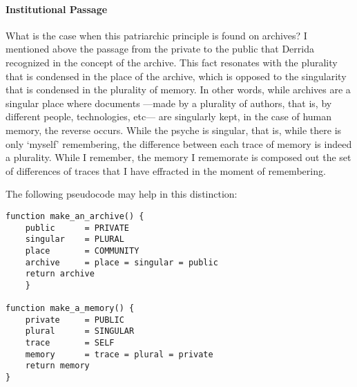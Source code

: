 \paragraph{Institutional Passage}
What is the case when this patriarchic principle is found on archives? I mentioned above the passage from the private to the public that Derrida recognized in the concept of the archive. This fact resonates with the plurality that is condensed in the place of the archive, which is opposed to the singularity that is condensed in the plurality of memory. In other words, while archives are a singular place where documents ---made by a plurality of authors, that is, by different people, technologies, etc--- are singularly kept, in the case of human memory, the reverse occurs. While the psyche is singular, that is, while there is only `myself' remembering, the difference between each trace of memory is indeed a plurality. While I remember, the memory I rememorate is composed out the set of differences of traces that I have effracted in the moment of remembering. 

The following pseudocode may help in this distinction:

\begin{flushleft}
\small
\begin{lstlisting}
function make_an_archive() {
	public 	 	= PRIVATE
	singular 	= PLURAL
	place 	 	= COMMUNITY
	archive  	= place = singular = public
	return archive
	}

function make_a_memory() {
	private 	= PUBLIC
	plural 		= SINGULAR
	trace 		= SELF
	memory 		= trace = plural = private 
	return memory
}
\end{lstlisting}
\end{flushleft}


